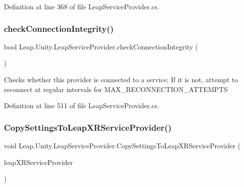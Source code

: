 Definition at line 368 of file Leap\+Service\+Provider.\+cs.

\mbox{\label{class_leap_1_1_unity_1_1_leap_service_provider_af943038b16006eb527d6e2a0dccc84c9}} 
\subsubsection{\texorpdfstring{checkConnectionIntegrity()}{checkConnectionIntegrity()}}
{\footnotesize\ttfamily bool Leap.\+Unity.\+Leap\+Service\+Provider.\+check\+Connection\+Integrity (\begin{DoxyParamCaption}{ }\end{DoxyParamCaption})\hspace{0.3cm}{\ttfamily [protected]}}



Checks whether this provider is connected to a service; If it is not, attempt to reconnect at regular intervals for M\+A\+X\+\_\+\+R\+E\+C\+O\+N\+N\+E\+C\+T\+I\+O\+N\+\_\+\+A\+T\+T\+E\+M\+P\+TS 



Definition at line 511 of file Leap\+Service\+Provider.\+cs.

\mbox{\label{class_leap_1_1_unity_1_1_leap_service_provider_ada1aaf6421decbb20a418c412193033c}} 
\subsubsection{\texorpdfstring{CopySettingsToLeapXRServiceProvider()}{CopySettingsToLeapXRServiceProvider()}}
{\footnotesize\ttfamily void Leap.\+Unity.\+Leap\+Service\+Provider.\+Copy\+Settings\+To\+Leap\+X\+R\+Service\+Provider (\begin{DoxyParamCaption}\item[{\mbox{\hyperlink{class_leap_1_1_unity_1_1_leap_x_r_service_provider}{Leap\+X\+R\+Service\+Provider}}}]{leap\+X\+R\+Service\+Provider }\end{DoxyParamCaption})}



